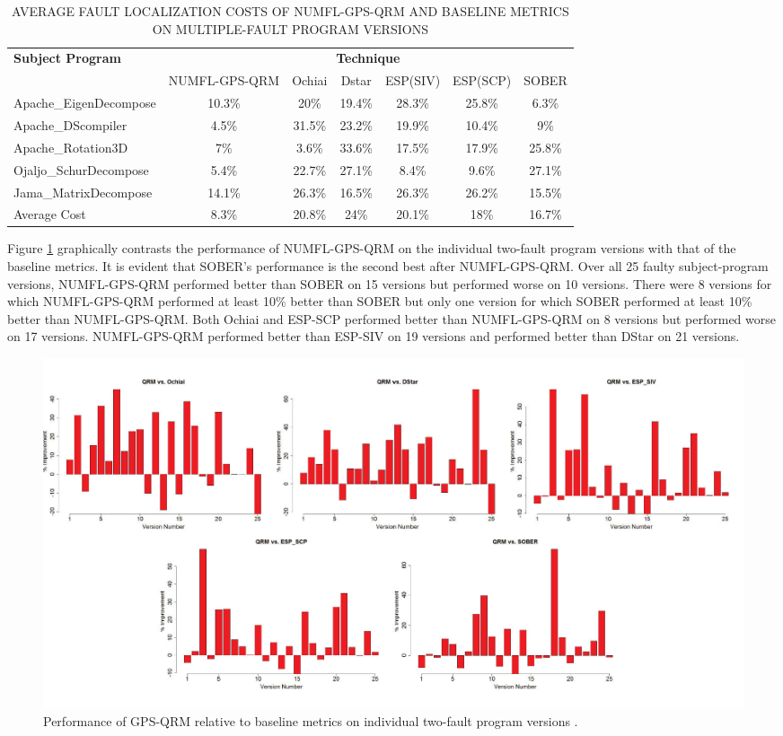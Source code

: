 \begin{table}[htbp!]
\fontsize{8pt}{9pt}\selectfont
\centering
\caption{AVERAGE FAULT LOCALIZATION COSTS OF NUMFL-GPS-QRM AND BASELINE METRICS ON MULTIPLE-FAULT PROGRAM VERSIONS}
\label{table4}
      \begin{tabular}{|l|c|c|c|c|c|c|}
      \hline
\multirow{2}{*}{{\bf Subject Program}}	&	\multicolumn{6}{|c|}{{\bf Technique}}	\\	\cline{2-7}
&{NUMFL-GPS-QRM}	&Ochiai&	Dstar&	ESP(SIV) &	ESP(SCP)	&SOBER \\\hline
Apache\_EigenDecompose	&	10.3\%	&	20\%	&	19.4\%	&	28.3\%	&	25.8\%	&	6.3\%	\\	\hline
Apache\_DScompiler	&	4.5\%	&	31.5\%	&	23.2\%	&	19.9\%	&	10.4\%	&	9\%	\\	\hline
Apache\_Rotation3D	&	7\%	&	3.6\%	&	33.6\%	&	17.5\%	&	17.9\%	&	25.8\%	\\	\hline
Ojaljo\_SchurDecompose	&	5.4\%	&	22.7\%	&	27.1\%	&	8.4\%	&	9.6\%	&	27.1\%	\\	\hline
Jama\_MatrixDecompose	&	14.1\%	&	26.3\%	&	16.5\%	&	26.3\%	&	26.2\%	&	15.5\%	\\	\hline
Average Cost	&	8.3\%	&	20.8\%	&	24\%	&	20.1\%	&	18\%	&	16.7\%	\\	\hline
\end{tabular}
\end{table}

Figure \ref{QRM_VS_Base_MultipleFault} graphically contrasts the performance of NUMFL-GPS-QRM on the individual two-fault program versions with that of the baseline metrics.  It is evident that SOBER's performance is the second best after NUMFL-GPS-QRM.  Over all 25 faulty subject-program versions, NUMFL-GPS-QRM performed better than SOBER on 15 versions but performed worse on 10 versions.  There were 8 versions for which NUMFL-GPS-QRM performed at least 10\% better than SOBER but only one version for which SOBER performed at least 10\% better than NUMFL-GPS-QRM.  Both Ochiai and ESP-SCP performed better than NUMFL-GPS-QRM on 8 versions but performed worse on 17 versions.  NUMFL-GPS-QRM performed better than ESP-SIV on 19 versions and performed better than DStar on 21 versions.

\begin{figure}
\centering
\includegraphics[width=\textwidth]{chapter3_QRM_VS_Base_MultipleFault.pdf}
\caption{Performance of GPS-QRM relative to baseline metrics on individual two-fault program versions .}
\label{QRM_VS_Base_MultipleFault}
\end{figure}

